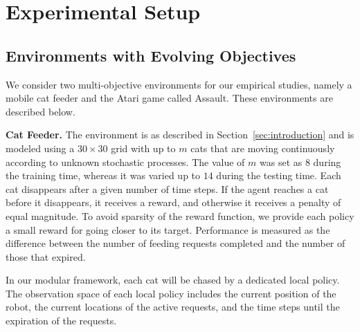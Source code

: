\section{Experimental Setup}

\subsection{Environments with Evolving Objectives}
We consider two multi-objective environments for our empirical studies, namely a mobile cat feeder and the Atari game called Assault.
These environments are described below.

\textbf{Cat Feeder.} 
The environment is as described in Section~\ref{sec:introduction} and is modeled using a $30\times 30$ grid with up to $m$ cats that are moving continuously according to unknown stochastic processes.
The value of $m$ was set as $8$ during the training time, whereas it was varied up to $14$ during the testing time.
Each cat disappears after a given number of time steps.
If the agent reaches a cat before it disappears, it receives a reward, and otherwise it receives a penalty of equal magnitude.
To avoid sparsity of the reward function, we provide each policy a small reward for going closer to its target.
Performance is measured as the difference between the number of feeding requests completed and the number of those that expired.

In our modular framework, each cat will be chased by a dedicated local policy.
The observation space of each local policy includes the current position of the robot, the current locations of the active requests, and the time steps until the expiration of the requests.

